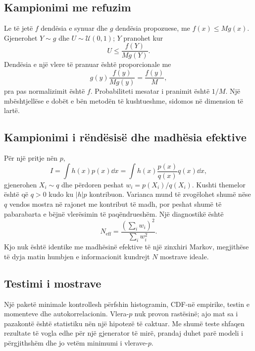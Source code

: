 \subsection{Kampionimi me refuzim}
Le të jetë $f$ dendësia e synuar dhe $g$ dendësia propozuese, me $f(x)\le Mg(x)$. Gjenerohet $Y\sim g$ dhe $U\sim\mathcal U(0,1)$; $Y$ pranohet kur
\begin{equation}
 U\le\frac{f(Y)}{Mg(Y)}.
\end{equation}
Dendësia e një vlere të pranuar është proporcionale me
\begin{equation}
 g(y)\frac{f(y)}{Mg(y)}=\frac{f(y)}{M},
\end{equation}
pra pas normalizimit është $f$. Probabiliteti mesatar i pranimit është $1/M$. Një mbështjellëse e dobët e bën metodën të kushtueshme, sidomos në dimension të lartë.

\subsection{Kampionimi i rëndësisë dhe madhësia efektive}
Për një pritje nën $p$,
\begin{equation}
 I=\int h(x)p(x)\dd x
 =\int h(x)\frac{p(x)}{q(x)}q(x)\dd x,
\end{equation}
gjenerohen $X_i\sim q$ dhe përdoren peshat $w_i=p(X_i)/q(X_i)$. Kushti themelor është që $q>0$ kudo ku $|h|p$ kontribuon. Varianca mund të zvogëlohet shumë nëse $q$ vendos mostra në rajonet me kontribut të madh, por peshat shumë të pabarabarta e bëjnë vlerësimin të paqëndrueshëm. Një diagnostikë është
\begin{equation}
 N_{\mathrm{eff}}=\frac{(\sum_iw_i)^2}{\sum_iw_i^2}.
\end{equation}
Kjo nuk është identike me madhësinë efektive të një zinxhiri Markov, megjithëse të dyja matin humbjen e informacionit kundrejt $N$ mostrave ideale.

\subsection{Testimi i mostrave}
Një paketë minimale kontrollesh përfshin histogramin, CDF-në empirike, testin e momenteve dhe autokorrelacionin. Vlera-$p$ nuk provon rastësinë; ajo mat sa i pazakontë është statistiku nën një hipotezë të caktuar. Me shumë teste shfaqen rezultate të vogla edhe për një gjenerator të mirë, prandaj duhet parë modeli i përgjithshëm dhe jo vetëm minimumi i vlerave-$p$.

